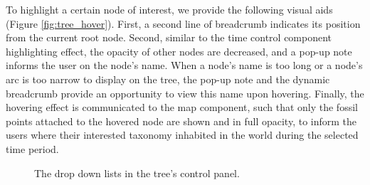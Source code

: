 \documentclass[11pt, a4paper,oneside,chapterprefix=false]{scrbook}
\begin{document}
To highlight a certain node of interest, we provide the following visual aids (Figure \ref{fig:tree_hover}). First, a second line of breadcrumb indicates its position from the current root node. Second, similar to the time control component highlighting effect, the opacity of other nodes are decreased, and a pop-up note informs the user on the node's name. When a node's name is too long or a node's arc is too narrow to display on the tree, the pop-up note and the dynamic breadcrumb provide an opportunity to view this name upon hovering. Finally, the hovering effect is communicated to the map component, such that only the fossil points attached to the hovered node are shown and in full opacity, to inform the users where their interested taxonomy inhabited in the world during the selected time period. \\

\begin{figure}[h]
	\centering
	\hfill
	\caption{The drop down lists in the tree's control panel.}
	\label{fig:tree_dropdown}
\end{figure}
\end{document}
